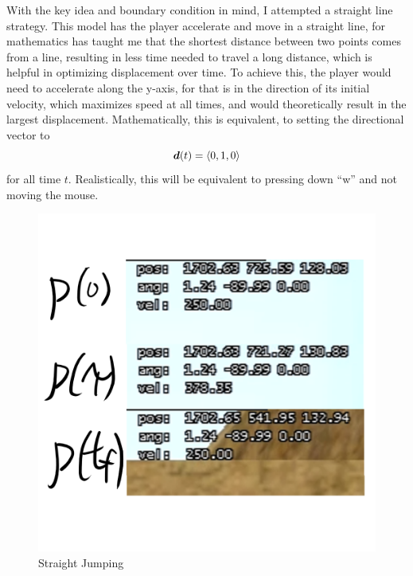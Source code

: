 With the key idea and boundary condition in mind, I attempted a straight line strategy. This model has the player accelerate and move in a straight line, for mathematics has taught me that the shortest distance between two points comes from a line, resulting in less time needed to travel a long distance, which is helpful in optimizing displacement over time. To achieve this, the player would need to accelerate along the y-axis, for that is in the direction of its initial velocity, which maximizes speed at all times, and would theoretically result in the largest displacement. Mathematically, this is equivalent, to setting the directional vector to
\[
    \boldsymbol{d}(t) = \left\langle 0, 1, 0 \right\rangle
\]
for all time $t$. Realistically, this will be equivalent to pressing down ``w'' and not moving the mouse.
\begin{figure}[H]
    \centering
    \begin{minipage}{.5\textwidth}
        \centering
        \includegraphics[width=0.9\linewidth]{assets/2straightjumping.png}
        \caption{Straight Jumping}
        \label{fig:2straightjumping}
    \end{minipage}%
    \begin{minipage}{.5\textwidth}
        \centering

\end{minipage}
\end{figure}
